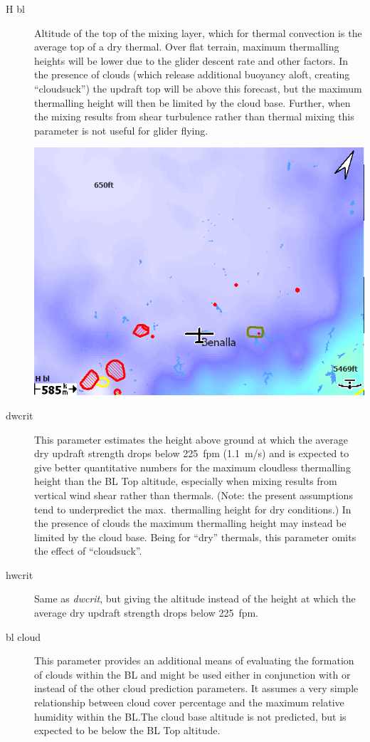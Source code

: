 \begin{description}
\item[H bl]  
Altitude of the top of the mixing layer, which for thermal convection is
the average top of a dry thermal.  Over flat terrain, maximum
thermalling heights will be lower due to the glider descent rate and
other factors.  In the presence of clouds (which release additional
buoyancy aloft, creating ``cloudsuck'') the updraft top will be above
this forecast, but the maximum thermalling height will then be limited
by the cloud base.  Further, when the mixing results from shear
turbulence rather than thermal mixing this parameter is not useful for
glider flying.

\begin{center}
\includegraphics[angle=0,width=0.8\linewidth,keepaspectratio='true']{figures/rasp-hbl.png}
\end{center}

\item[dwcrit]  
This parameter estimates the height above ground at which the average
dry updraft strength drops below 225~fpm (1.1~m/s) and is expected to give
better quantitative numbers for the maximum cloudless thermalling
height than the BL Top altitude, especially when mixing results from
vertical wind shear rather than thermals.  (Note: the present
assumptions tend to underpredict the max.\ thermalling height for dry
conditions.) In the presence of clouds the maximum thermalling height
may instead be limited by the cloud base.  Being for ``dry'' thermals,
this parameter omits the effect of ``cloudsuck''.

\item[hwcrit]  
Same as \emph{dwcrit}, but giving the altitude instead of the height at which the average
dry updraft strength drops below 225~fpm.

\item[bl cloud]  
This parameter provides an additional means of evaluating the
formation of clouds within the BL and might be used either in
conjunction with or instead of the other cloud prediction parameters.
It assumes a very simple relationship between cloud cover percentage
and the maximum relative humidity within the BL.\@  The cloud base
altitude is not predicted, but is expected to be below the BL Top
altitude.


\end{description}
